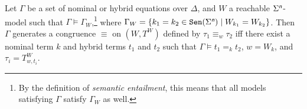 \documentclass[a4paper,UKenglish,cleveref,autoref]{lipics-v2019}
\begin{document}
\begin{proposition}
  \label{proposition:Gamma-congruence}
  Let\/ \(\Gamma\) be a set of nominal or hybrid equations over \(\Delta\), and\/
  \(W\) a reachable \(\Sigma^{\text{\normalfont\sffamily\itshape n}}\)-model such that\/
  \(\Gamma \models \Gamma_{W}\),\footnote{By the definition of \emph{semantic entailment}, this means that all models satisfying \(\Gamma\) satisfy \(\Gamma_{W}\) as well.} where \(\Gamma_{W} = \{k_{1} = k_{2} \in \mathtt{Sen}(\Sigma^{\text{\normalfont\sffamily\itshape n}}) \mid W_{k_{1}} = W_{k_{2}}\}\).
  Then \(\Gamma\) generates a congruence \(\equiv\) on \((W, T^{W})\) defined by
  \(\tau_{1} \equiv_{w} \tau_{2}\) iff there exist a nominal term \(k\) and hybrid terms \(t_{1}\) and \(t_{2}\) such that\/
  \(\Gamma \models t_{1} =_{k} t_{2}\), \(w = W_{k}\), and \(\tau_{i} = T^{W}_{w, t_{i}}\).
\end{proposition}
\end{document}
